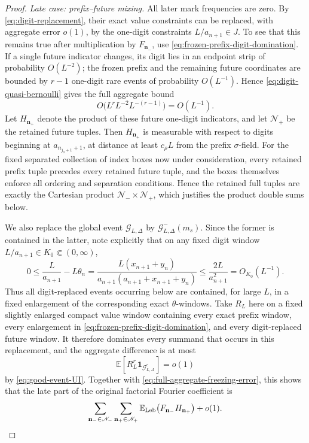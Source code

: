 \documentclass[11pt]{article}
\numberwithin{equation}{section}
\theoremstyle{definition}
\newcommand{\E}{\mathbb E}
\newcommand{\1}{\mathbf 1}
\begin{document}
\begin{proof}
\medskip
\noindent\emph{Late case: prefix--future mixing.}
All later mark frequencies are zero.  By
\eqref{eq:digit-replacement}, their exact value constraints can be
replaced, with aggregate error \(o(1)\), by the one-digit constraints
\(L/a_{n+1}\in J\).  To see that this remains true after multiplication
by \(F_{\mathbf n_-}\), use
\eqref{eq:frozen-prefix-digit-domination}.  If a single future
indicator changes, its digit lies in an endpoint strip of probability
\(O(L^{-2})\); the frozen prefix and the remaining future coordinates
are bounded by \(r-1\) one-digit rare events of probability
\(O(L^{-1})\).  Hence \eqref{eq:digit-quasi-bernoulli} gives the full
aggregate bound
\[
 O\bigl(L^rL^{-2}L^{-(r-1)}\bigr)=O(L^{-1}).
\]
Let
\(H_{\mathbf n_+}\) denote the product of these future one-digit
indicators, and let \(\mathscr N_+\) be the retained future tuples.
Then \(H_{\mathbf n_+}\) is measurable with respect to digits beginning
at \(a_{n_{j_0+1}+1}\), at distance at least \(c_\rho L\) from the
prefix \(\sigma\)-field.
For the fixed separated collection of index boxes now under
consideration, every retained prefix tuple precedes every retained
future tuple, and the boxes themselves enforce all ordering and
separation conditions.  Hence the retained full tuples are exactly
the Cartesian product \(\mathscr N_-\times\mathscr N_+\), which
justifies the product double sums below.

We also replace the global event \(\mathcal G_{L,\Delta}\) by
\(\mathcal G^-_{L,\Delta}(m_s)\).  Since the former is contained in
the latter, note explicitly that on any fixed digit window
\(L/a_{n+1}\in K_0\Subset(0,\infty)\),
\[
 0\le \frac{L}{a_{n+1}}-L\theta_n
 =\frac{L(x_{n+1}+y_n)}
        {a_{n+1}(a_{n+1}+x_{n+1}+y_n)}
 \le\frac{2L}{a_{n+1}^2}=O_{K_0}(L^{-1}).
\]
Thus all digit-replaced events occurring below are contained, for
large \(L\), in a fixed enlargement of the corresponding exact
\(\theta\)-windows.  Take \(R_L\) here on a fixed slightly enlarged compact
value window containing every exact prefix window, every enlargement
in \eqref{eq:frozen-prefix-digit-domination}, and every
digit-replaced future window.  It therefore dominates every summand
that occurs in this replacement, and the aggregate difference is at
most
\[
 \E\left[R_L^r\1_{\mathcal G_{L,\Delta}^c}\right]=o(1)
\]
by \eqref{eq:good-event-UI}.  Together with
\eqref{eq:full-aggregate-freezing-error}, this shows that the late part
of the original factorial Fourier coefficient is
\begin{equation}\label{eq:late-frozen-sum}
 \sum_{\mathbf n_-\in\mathscr N_-}
 \sum_{\mathbf n_+\in\mathscr N_+}
 \E_{\rm Leb}\bigl(F_{\mathbf n_-}H_{\mathbf n_+}\bigr)+o(1).
\end{equation}


\end{proof}
\end{document}
